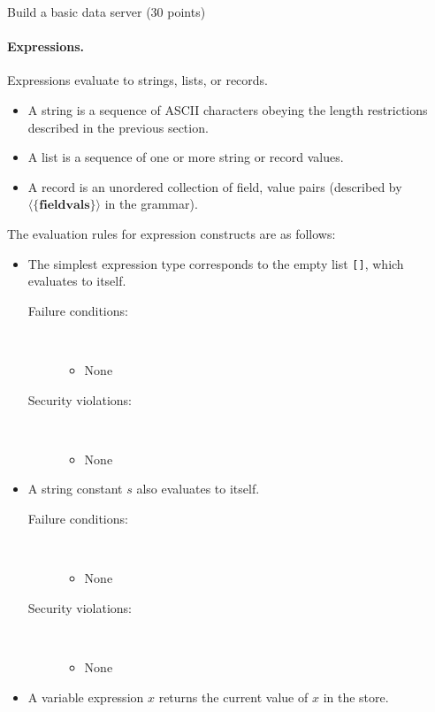 \documentclass[11pt]{article}
\begin{document}
\begin{problem}{Build a basic data server (30 points)}
\paragraph{Expressions.} Expressions evaluate to strings, lists, or records.
\begin{itemize}
\item A string is a sequence of ASCII characters obeying the length restrictions described in the previous section. 
\item A list is a sequence of one or more string or record values. 
\item A record is an unordered collection of field, value pairs (described by $\langle\{\mathbf{fieldvals}\}\rangle$ in the grammar).
\end{itemize}
The evaluation rules for expression constructs are as follows:
\begin{itemize}
\item The simplest expression type corresponds to the empty list \texttt{[]}, which evaluates to itself.
\begin{description}
\item[Failure conditions:]\ \\[-1.5em]
\begin{itemize}
\item None
\end{itemize}
\item[Security violations:]\ \\[-1.5em]
\begin{itemize}
\item None
\end{itemize}
\end{description}
\item A string constant $s$ also evaluates to itself.
\begin{description}
\item[Failure conditions:]\ \\[-1.5em]
\begin{itemize}
\item None
\end{itemize}
\item[Security violations:]\ \\[-1.5em]
\begin{itemize}
\item None
\end{itemize}
\end{description}
\item A variable expression $x$ returns the current value of $x$ in the store.

\end{itemize}
\end{problem}
\end{document}
